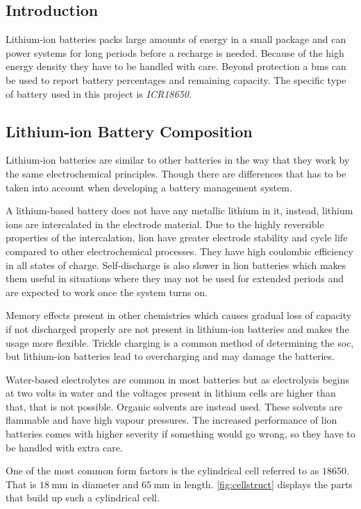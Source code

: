 
\subsection{Introduction}
Lithium-ion batteries packs large amounts of energy in a small package and can power systems for long periods before a recharge is needed. Because of the high energy density they have to be handled with care. Beyond protection a \gls{bms} can be used to report battery percentages and remaining capacity. The specific type of battery used in this project is \emph{ICR18650}.


\subsection{Lithium-ion Battery Composition}
Lithium-ion batteries are similar to other batteries in the way that they work by the same electrochemical principles. Though there are differences that has to be taken into account when developing a battery management system.

A lithium-based battery does not have any metallic lithium in it, instead, lithium ions are intercalated in the electrode material. Due to the highly reversible properties of the intercalation, \gls{lion} have greater electrode stability and cycle life compared to other electrochemical processes. They have high coulombic efficiency in all states of charge. Self-discharge is also slower in \gls{lion} batteries which makes them useful in situations where they may not be used for extended periods and are expected to work once the system turns on.

Memory effects present in other chemistries which causes gradual loss of capacity if not discharged properly are not present in lithium-ion batteries and makes the usage more flexible. Trickle charging is a common method of determining the \gls{soc}, but lithium-ion batteries lead to overcharging and may damage the batteries.

Water-based electrolytes are common in most batteries but as electrolysis begins at two volts in water and the voltages present in lithium cells are higher than that, that is not possible. Organic solvents are instead used. These solvents are flammable and have high vapour pressures. The increased performance of \gls{lion} batteries comes with higher severity if something would go wrong, so they have to be handled with extra care.

One of the most common form factors is the cylindrical cell referred to as $18650$. That is $18~\textrm{mm}$ in diameter and $65~\textrm{mm}$ in length\cite[p. 26-27]{book}. \autoref{fig:cellstruct} displays the parts that build up such a cylindrical cell.

